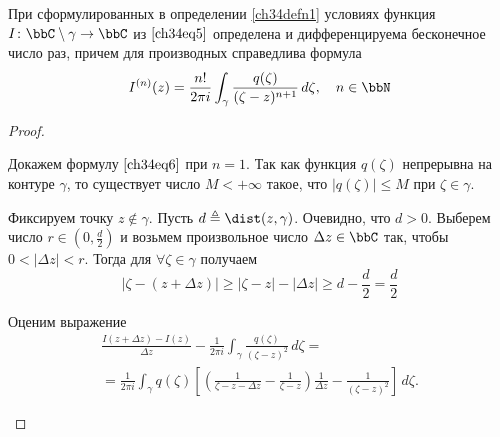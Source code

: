 \begin{thm} \label{ch34Thm2}
При сформулированных в определении \ref{ch34defn1} условиях функция $I\colon\bbC \setminus \gamma \to \bbC$ из $\eqref{ch34eq5}$ определена и дифференцируема бесконечное число раз, причем для производных справедлива формула
\begin{equation} \label{ch34eq6}
I^{(n)}(z) = \frac{n!}{2\pi i} \int_\gamma \frac{q(\zeta)}{(\zeta - z)^{n+1}}\,d\zeta, \quad n \in \bbN
\end{equation}
\end{thm}
\newpage%
\begin{proof}\leavevmode\vspace*{-0.5\baselineskip}
\begin{enumerate}[wide]
Докажем формулу $\eqref{ch34eq6}$ при $n = 1$. Так как функция $q(\zeta)$ непрерывна на контуре $\gamma$, то существует число $M < + \infty$ такое, что $|q(\zeta)| \le M$ при $\zeta \in \gamma$. %
    
Фиксируем точку $z \notin \gamma$. Пусть $d \triangleq \dist(z, \gamma)$. Очевидно, что $d > 0$. Выберем число $r \in (0, \frac{d}{2})$ и возьмем произвольное число $\Delta z \in \bbC$ так, чтобы $0 < |\Delta z| < r$. Тогда для $\forall \zeta \in \gamma$ получаем
\begin{equation} \label{ch34eq7}
|\zeta - (z + \Delta z)| \ge |\zeta - z| - |\Delta z| \ge d - \frac{d}{2} = \frac{d}{2}
\end{equation}

Оценим выражение 
\begin{multline} \label{ch34eq8}
\frac{I(z + \Delta z) - I(z)}{\Delta z} - \frac{1}{2 \pi i} \int_\gamma \frac{q(\zeta)}{(\zeta - z)^2}\,d\zeta=\\ = \frac{1}{2 \pi i} \int_\gamma q(\zeta) \left[ \left( \frac{1}{\zeta - z - \Delta z} - \frac{1}{\zeta - z} \right) \frac{1}{\Delta z} - \frac{1}{(\zeta - z)^2} \right] \,d\zeta.
\end{multline}


\end{enumerate}
\end{proof}
